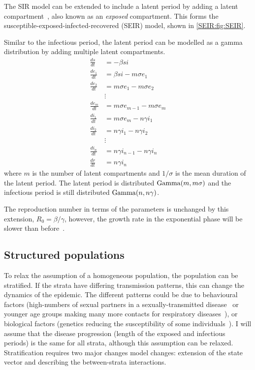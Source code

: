 \documentclass[thesis.tex]{subfiles}
\begin{document}
The SIR model can be extended to include a latent period by adding a latent compartment~\autocite[41]{keelingModeling}, also known as an \emph{exposed} compartment.
This forms the susceptible-exposed-infected-recovered (SEIR) model, shown in \cref{SEIR:fig:SEIR}.

Similar to the infectious period, the latent period can be modelled as a gamma distribution by adding multiple latent compartments.
\begin{align}
\frac{ds}{dt} &= -\beta si \\
\frac{de_1}{dt} &= \beta si - m\sigma e_1 \\
\frac{de_2}{dt} &= m\sigma e_1 - m \sigma e_2 \\
&\vdots \nonumber \\
\frac{de_m}{dt} &= m\sigma e_{m-1} - m \sigma e_m \\
\frac{di_1}{dt} &= m\sigma e_m - n\gamma i_1 \\
\frac{di_2}{dt} &= n\gamma i_1 - n \gamma i_2 \\
&\vdots \nonumber \\
\frac{di_n}{dt} &= n\gamma i_{n-1} - n \gamma i_n \\
\frac{dr}{dt} &= n\gamma i_n
\end{align}
where $m$ is the number of latent compartments and $1/\sigma$ is the mean duration of the latent period.
The latent period is distributed $\operatorname{Gamma}(m, m\sigma)$ and the infectious period is still distributed $\operatorname{Gamma}(n, n\gamma)$.

The reproduction number in terms of the parameters is unchanged by this extension, \ie $R_0 = \beta / \gamma$, however, the growth rate in the exponential phase will be slower than before~\autocite[41]{keelingModeling}.

\subsection{Structured populations} \label{SEIR:sec:structured-populations}

To relax the assumption of a homogeneous population, the population can be stratified.
If the strata have differing transmission patterns, this can change the dynamics of the epidemic.
The different patterns could be due to behavioural factors (\eg high-numbers of sexual partners in a sexually-transmitted disease~\autocite[69]{keelingModeling} or younger age groups making many more contacts for respiratory diseases~\autocite[176]{andersonInfectious}), or biological factors (\eg genetics reducing the susceptibility of some individuals~\autocite[208]{andersonInfectious}).
I will assume that the disease progression (\ie length of the exposed and infectious periods) is the same for all strata, although this assumption can be relaxed.
Stratification requires two major changes model changes: extension of the state vector and describing the between-strata interactions.
\end{document}
